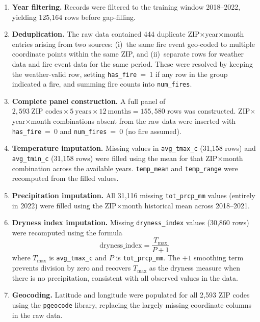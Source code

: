 \documentclass[11pt,a4paper]{article}
\begin{document}
\begin{enumerate}[leftmargin=*]
    \item \textbf{Year filtering.} Records were filtered to the training window
          2018--2022, yielding 125,164 rows before gap-filling.

    \item \textbf{Deduplication.} The raw data contained 444 duplicate
          ZIP$\times$year$\times$month entries arising from two sources:
          (i)~the same fire event geo-coded to multiple coordinate points within
          the same ZIP, and (ii)~separate rows for weather data and fire event
          data for the same period. These were resolved by keeping the
          weather-valid row, setting \texttt{has\_fire}~=~1 if any row in the
          group indicated a fire, and summing fire counts into \texttt{num\_fires}.

    \item \textbf{Complete panel construction.} A full panel of
          $2{,}593\ \text{ZIP codes} \times 5\ \text{years} \times 12\ \text{months}
          = 155{,}580$ rows was constructed. ZIP$\times$year$\times$month
          combinations absent from the raw data were inserted with
          \texttt{has\_fire}~=~0 and \texttt{num\_fires}~=~0 (no fire assumed).

    \item \textbf{Temperature imputation.} Missing values in
          \texttt{avg\_tmax\_c} (31,158 rows) and \texttt{avg\_tmin\_c} (31,158
          rows) were filled using the mean for that ZIP$\times$month combination
          across the available years. \texttt{temp\_mean} and
          \texttt{temp\_range} were recomputed from the filled values.

    \item \textbf{Precipitation imputation.} All 31,116 missing
          \texttt{tot\_prcp\_mm} values (entirely in 2022) were filled using
          the ZIP$\times$month historical mean across 2018--2021.

    \item \textbf{Dryness index imputation.} Missing \texttt{dryness\_index}
          values (30,860 rows) were recomputed using the formula
          \begin{equation}
              \text{dryness\_index} = \frac{T_{\max}}{P + 1}
              \label{eq:dryness}
          \end{equation}
          where $T_{\max}$ is \texttt{avg\_tmax\_c} and $P$ is
          \texttt{tot\_prcp\_mm}. The $+1$ smoothing term prevents division
          by zero and recovers $T_{\max}$ as the dryness measure when there
          is no precipitation, consistent with all observed values in the data.

    \item \textbf{Geocoding.} Latitude and longitude were populated for all
          2,593 ZIP codes using the \texttt{pgeocode} library, replacing the
          largely missing coordinate columns in the raw data.
\end{enumerate}
\end{document}
